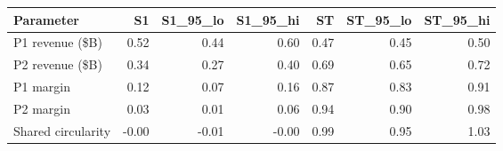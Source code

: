 

\begin{tabular}{@{}lrrrrrr@{}}
\toprule
Parameter & S1 & S1\_95\_lo & S1\_95\_hi & ST & ST\_95\_lo & ST\_95\_hi \\
\midrule
P1 revenue (\$B) & 0.52 & 0.44 & 0.60 & 0.47 & 0.45 & 0.50 \\
P2 revenue (\$B) & 0.34 & 0.27 & 0.40 & 0.69 & 0.65 & 0.72 \\
P1 margin & 0.12 & 0.07 & 0.16 & 0.87 & 0.83 & 0.91 \\
P2 margin & 0.03 & 0.01 & 0.06 & 0.94 & 0.90 & 0.98 \\
Shared circularity & -0.00 & -0.01 & -0.00 & 0.99 & 0.95 & 1.03 \\
\bottomrule
\end{tabular}